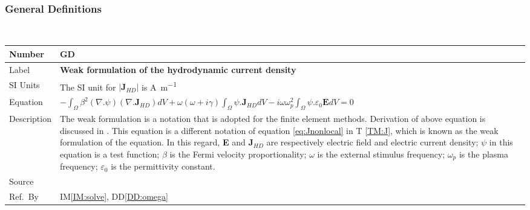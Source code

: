 \documentclass[12pt]{article}
\newcommand{\colBwidth}{0.82\textwidth} \newcommand{\colCwidth}{0.1\textwidth}
\newcounter{defnum} %
\begin{document}
	~\newline
	
	
	\subsubsection{General Definitions}\label{sec_gendef}
	~\newline \noindent \begin{minipage}{\textwidth}
		\renewcommand*{\arraystretch}{1.5} \begin{tabular}{| p{\colAwidth} |
				p{\colBwidth}|} \hline \rowcolor[gray]{0.9} Number&
			GD{defnum}\thedefnum \label{GD:weakJ}\\ \hline Label &\bf Weak
			formulation of the hydrodynamic current density  \\ \hline %
			SI Units& The SI unit for $|\textbf{J}_{HD}|$ is \si{\ampere \per \metre}\\ \hline
			Equation& $-\int_\Omega
			\beta^2(\nabla.\psi)(\nabla.\textbf{J}_{HD})dV+\omega(\omega+i\gamma)\int_{\Omega} \psi. \textbf{J}_{HD} dV - i\omega \omega^2_p \int_\Omega \psi.\varepsilon_{0}\textbf{E}dV = 0 $ \\ \hline Description & The weak formulation is a notation that is adopted for the finite element methods. Derivation of above equation is discussed in \cite{hiremath2012numerical}. This equation is a different notation of equation \ref{eq:Jnonlocal} in T \ref{TM:J}, which is known as the weak formulation of the equation. In this regard, \textbf{E} and \textbf{J}$_{HD}$ are respectively electric field and electric current density; $\psi$ in this equation is a test function; $\beta$ is the Fermi velocity proportionality; $\omega$ is the external stimulus frequency; $\omega_p$ is the plasma frequency; $\varepsilon_{0}$ is the permittivity constant.    \\ \hline Source & \cite{hiremath2012numerical}  \\ \hline Ref.\ By & IM\ref{IM:solve}, DD\ref{DD:omega}\\ \hline \end{tabular} \end{minipage}\\
	
	
	~\newline
	
\end{document}
